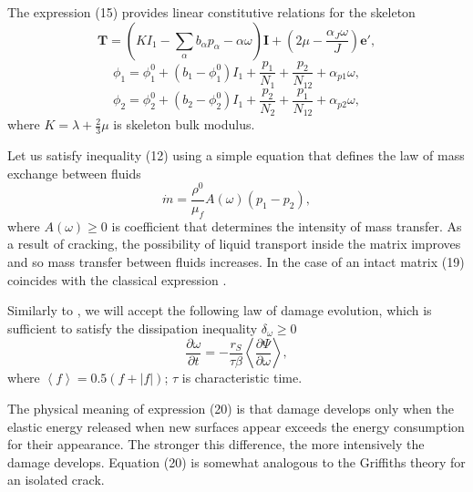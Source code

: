 \documentclass[article,authoryear,jpm]{beg_39}             %
\begin{document}
The expression (15) provides linear constitutive relations for the skeleton
\begin{equation}
\mathbf{T}=\left( K{{I}_{1}}-\sum\limits_{\alpha }{{{b}_{\alpha }}{{p}_{\alpha }}-\alpha \omega } \right)\mathbf{I}+\left( 2\mu -\frac{{{\alpha }_{J}}\omega }{J} \right)\mathbf{{e}'},
\end{equation}
\begin{equation}
{{\phi }_{1}}=\phi _{1}^{0}+\left( {{b}_{1}}-\phi _{1}^{0} \right){{I}_{1}}+\frac{{{p}_{1}}}{{{N}_{1}}}+\frac{{{p}_{2}}}{{{N}_{12}}}+{{\alpha }_{p1}}\omega ,
\end{equation}
\begin{equation}
{{\phi }_{2}}=\phi _{2}^{0}+\left( {{b}_{2}}-\phi _{2}^{0} \right){{I}_{1}}+\frac{{{p}_{2}}}{{{N}_{2}}}+\frac{{{p}_{1}}}{{{N}_{12}}}+{{\alpha }_{p2}}\omega ,
\end{equation}
where $K=\lambda +\frac{2}{3}\mu$ is skeleton bulk modulus.

Let us satisfy inequality (12) using a simple equation that defines the law of mass exchange between fluids
\begin{equation}
\dot{m}=\frac{\rho _{{}}^{0}}{{{\mu }_{f}}}A\left( \omega \right)\left( {{p}_{1}}-{{p}_{2}} \right),
\end{equation}
where $A\left( \omega \right)\ge 0$ is coefficient that determines the intensity of mass transfer. As a result of cracking, the possibility of liquid transport inside the matrix improves and so mass transfer between fluids increases. In the case of an intact matrix (19) coincides with the classical expression \cite{Barenblatt}.

Similarly to \cite{Kondaurov2002, Izvekov, Izvekov2020}, we will accept the following law of damage evolution, which is sufficient to satisfy the dissipation inequality ${{\delta }_{\omega }}\ge 0$
\begin{equation}
\frac{\partial \omega }{\partial t}=-\frac{{{r}_{S}}}{\tau \beta }\left\langle \frac{\partial \Psi }{\partial \omega }
 \right\rangle ,%
\end{equation}
where $\left\langle f \right\rangle =0.5(f+|f|)$; $\tau$ is characteristic time.

The physical meaning of expression (20) is that damage develops only when the elastic energy released when new surfaces appear exceeds the energy consumption for their appearance. The stronger this difference, the more intensively the damage develops. Equation (20) is somewhat analogous to the Griffiths theory for an isolated crack.
\end{document}
